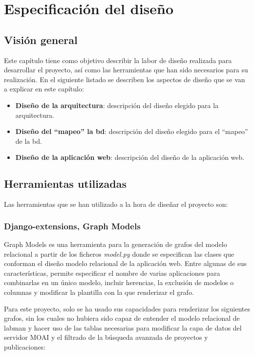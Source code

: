 \chapter{Especificación del diseño}\label{chap:design}

\section{Visión general}

Este capítulo tiene como objetivo describir la labor de diseño realizada para desarrollar el proyecto, así como las herramientas que han sido necesarios para su realización. En el siguiente listado se describen los aspectos de diseño que se van a explicar en este capítulo:

\begin{itemize}
	\item \textbf{Diseño de la arquitectura}: descripción del diseño elegido para la arquitectura.
	\item \textbf{Diseño del ``mapeo'' la \acrlong{bd}}: descripción del diseño elegido para el ``mapeo'' de la \acrshort{bd}.
	\item \textbf{Diseño de la aplicación web}: descripción del diseño de la aplicación web.

\end{itemize}

\section{Herramientas utilizadas}

Las herramientas que se han utilizado a la hora de diseñar el proyecto son:

\subsection{Django-extensions, Graph Models}

Graph Models es una herramienta para la generación de grafos del modelo relacional a partir de los ficheros \textit{model.py} donde se especifican las clases que conforman el diseño modelo relacional de la aplicación web. Entre algunas de sus características, permite especificar el nombre de varias aplicaciones para combinarlas en un único modelo, incluir herencias, la exclusión de modelos o columnas y modificar la plantilla con la que renderizar el grafo.

Para este proyecto, solo se ha usado sus capacidades para renderizar los siguientes grafos, sin los cuales no hubiera sido capaz de entender el modelo relacional de \acrshort{labman} y hacer uso de las tablas necesarias para modificar la capa de datos del servidor MOAI y el filtrado de la búsqueda avanzada de proyectos y publicaciones:

